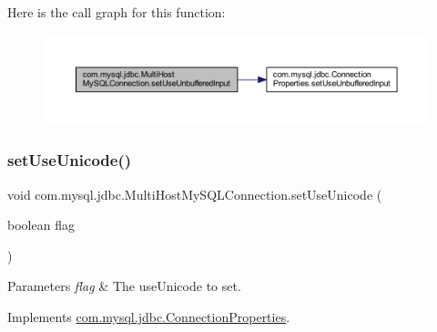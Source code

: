 Here is the call graph for this function\+:
\nopagebreak
\begin{figure}[H]
\begin{center}
\leavevmode
\includegraphics[width=350pt]{classcom_1_1mysql_1_1jdbc_1_1_multi_host_my_s_q_l_connection_a19da5784ea3e4f024042178f171d0441_cgraph}
\end{center}
\end{figure}
\mbox{\label{classcom_1_1mysql_1_1jdbc_1_1_multi_host_my_s_q_l_connection_afcdd021cd65ac9c824bf069c3d52a22b}} 
\subsubsection{\texorpdfstring{set\+Use\+Unicode()}{setUseUnicode()}}
{\footnotesize\ttfamily void com.\+mysql.\+jdbc.\+Multi\+Host\+My\+S\+Q\+L\+Connection.\+set\+Use\+Unicode (\begin{DoxyParamCaption}\item[{boolean}]{flag }\end{DoxyParamCaption})}


\begin{DoxyParams}{Parameters}
{\em flag} & The use\+Unicode to set. \\
\hline
\end{DoxyParams}


Implements \mbox{\hyperlink{interfacecom_1_1mysql_1_1jdbc_1_1_connection_properties_a2b78e87d6cfd73e15066b8bdbc0cecb0}{com.\+mysql.\+jdbc.\+Connection\+Properties}}.

